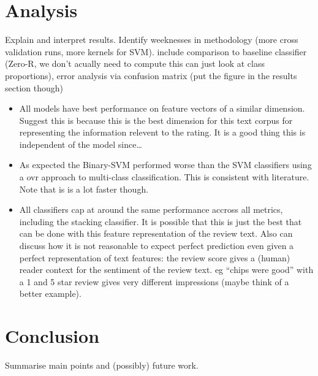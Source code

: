 \documentclass[11pt]{article}
\newcommand{\drafting}[1]{\textcolor{OliveGreen}{#1}}
\begin{document}
\section{Analysis}
\drafting{
Explain and interpret results. Identify weeknesses in methodology (more cross validation runs, more kernels for SVM).
include comparison to baseline classifier (Zero-R, we don't acually need to compute this can just look at class proportions), error analysis via confusion matrix (put the figure in the results section though)
}

\drafting{
    \begin{itemize}
        \item All models have best performance on feature vectors of a similar dimension. Suggest this is because this is the best dimension for this text corpus for representing the information relevent to the rating. It is a good thing this is independent of the model since\dots
        \item As expected the Binary-SVM performed worse than the SVM classifiers using a ovr approach to multi-class classification. This is consistent with literature. Note that is is a lot faster though.
        \item All classifiers cap at around the same performance accross all metrics, including the stacking classifier. It is possible that this is just the best that can be done with this feature representation of the review text. Also can discuss how it is not reasonable to expect perfect prediction even given a perfect representation of text features: the review score gives a (human) reader context for the sentiment of the review text. eg ``chips were good'' with a 1 and 5 star review gives very different impressions (maybe think of a better example).
    \end{itemize}
}

\section{Conclusion}
\drafting{Summarise main points and (possibly) future work.}


\nocite{mukherjee_what_2013}
\nocite{rayana_collective_2015}

\nocite{sklearn_pedregosa_scikit-learn_2011}
\nocite{gensim_rehurek_software_2010}


\end{document}

